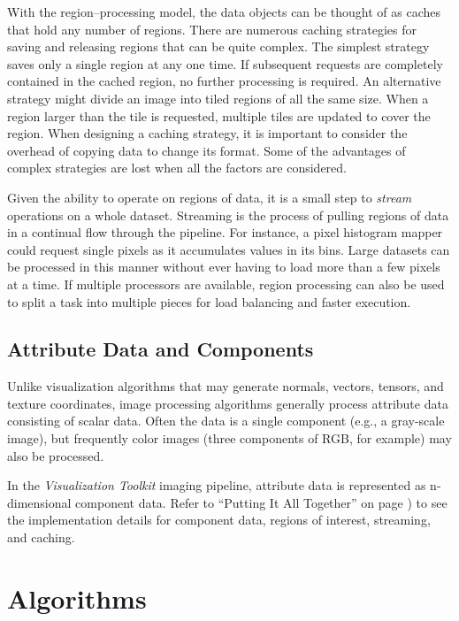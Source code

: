 With the region--processing model, the data objects can be thought of as caches that hold any number of regions. There are numerous caching strategies for saving and releasing regions that can be quite complex. The simplest strategy saves only a single region at any one time. If subsequent requests are completely contained in the cached region, no further processing is required. An alternative strategy might divide an image into tiled regions of all the same size. When a region larger than the tile is requested, multiple tiles are updated to cover the region. When designing a caching strategy, it is important to consider the overhead of copying data to change its format. Some of the advantages of complex strategies are lost when all the factors are considered.

Given the ability to operate on regions of data, it is a small step to \emph{stream} operations on a whole dataset. Streaming is the process of pulling regions of data in a continual flow through the pipeline. For instance, a pixel histogram mapper could request single pixels as it accumulates values in its bins. Large datasets can be processed in this manner without ever having to load more than a few pixels at a time. If multiple processors are available, region processing can also be used to split a task into multiple pieces for load balancing and faster execution.

\subsection{Attribute Data and Components}

Unlike visualization algorithms that may generate normals, vectors, tensors, and texture coordinates, image processing algorithms generally process attribute data consisting of scalar data. Often the data is a single component (e.g., a gray-scale image), but frequently color images (three components of RGB, for example) may also be processed.

In the \emph{Visualization Toolkit} imaging pipeline, attribute data is represented as n-dimensional component data. Refer to ``Putting It All Together'' on page \pageref{sec:chap10.putting_it_all_together}) to see the implementation details for component data, regions of interest, streaming, and caching.

\section{Algorithms}

